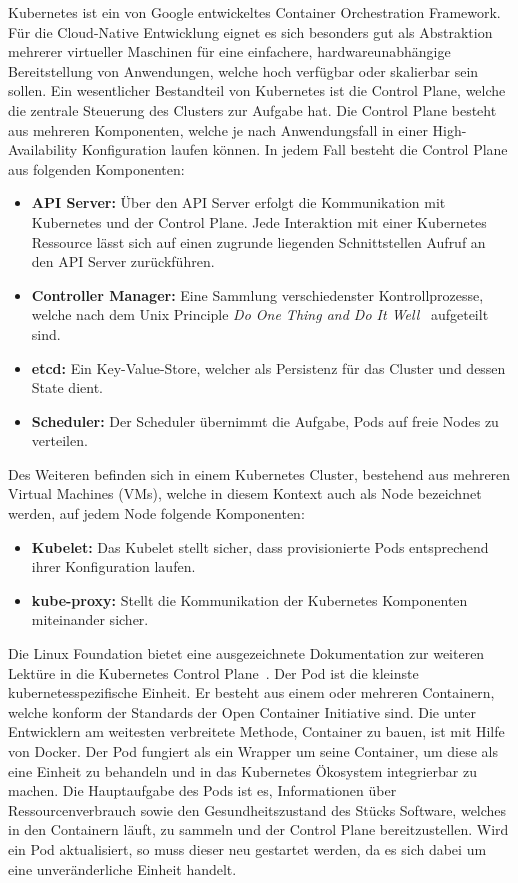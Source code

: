 Kubernetes ist ein von Google entwickeltes Container Orchestration Framework.
Für die Cloud-Native Entwicklung eignet es sich besonders gut als Abstraktion mehrerer virtueller Maschinen für eine einfachere, hardwareunabhängige Bereitstellung von Anwendungen, welche hoch verfügbar oder skalierbar sein sollen.
Ein wesentlicher Bestandteil von Kubernetes ist die Control Plane, welche die zentrale Steuerung des Clusters zur Aufgabe hat.
Die Control Plane besteht aus mehreren Komponenten, welche je nach Anwendungsfall in einer High-Availability Konfiguration laufen können.
In jedem Fall besteht die Control Plane aus folgenden Komponenten:
\begin{itemize}
    \item \textbf{API Server:} Über den API Server erfolgt die Kommunikation mit Kubernetes und der Control Plane.
    Jede Interaktion mit einer Kubernetes Ressource lässt sich auf einen zugrunde liegenden Schnittstellen Aufruf an den API Server zurückführen.
    \item \textbf{Controller Manager:} Eine Sammlung verschiedenster Kontrollprozesse, welche nach dem Unix Principle \emph{Do One Thing and Do It Well}~\cite{gancarz2003linux} aufgeteilt sind.
    \item \textbf{etcd:} Ein Key-Value-Store, welcher als Persistenz für das Cluster und dessen State dient.
    \item \textbf{Scheduler:} Der Scheduler übernimmt die Aufgabe, Pods auf freie Nodes zu verteilen.
\end{itemize}

Des Weiteren befinden sich in einem Kubernetes Cluster, bestehend aus mehreren Virtual Machines (VMs), welche in diesem Kontext auch als Node bezeichnet werden, auf jedem Node folgende Komponenten:

\begin{itemize}
    \item \textbf{Kubelet:} Das Kubelet stellt sicher, dass provisionierte Pods entsprechend ihrer Konfiguration laufen.
    \item \textbf{kube-proxy:} Stellt die Kommunikation der Kubernetes Komponenten miteinander sicher.
\end{itemize}
Die Linux Foundation bietet eine ausgezeichnete Dokumentation zur weiteren Lektüre in die Kubernetes Control Plane~\cite{kubernetescomponents}.
Der Pod ist die kleinste kubernetesspezifische Einheit.
Er besteht aus einem oder mehreren Containern, welche konform der Standards der Open Container Initiative sind.
Die unter Entwicklern am weitesten verbreitete Methode, Container zu bauen, ist mit Hilfe von Docker.
Der Pod fungiert als ein Wrapper um seine Container, um diese als eine Einheit zu behandeln und in das Kubernetes Ökosystem integrierbar zu machen.
Die Hauptaufgabe des Pods ist es, Informationen über Ressourcenverbrauch sowie den Gesundheitszustand des Stücks Software, welches in den Containern läuft, zu sammeln und der Control Plane bereitzustellen.
Wird ein Pod aktualisiert, so muss dieser neu gestartet werden, da es sich dabei um eine unveränderliche Einheit handelt.

